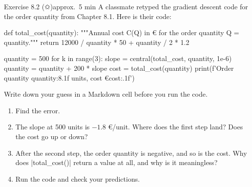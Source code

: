 \documentclass[paper=a4, fontsize=11pt, parskip=half]{scrartcl}
\begin{document}
\clearpage
\begin{aufgabe}{Exercise 8.2 (✩)}{approx.\ 5 min}
A classmate retyped the gradient descent code for the order quantity from Chapter 8.1. Here is their code:

\begin{code}
def total_cost(quantity):
    """Annual cost C(Q) in € for the order quantity Q = quantity."""
    return 12000 / quantity * 50 + quantity / 2 * 1.2

quantity = 500
for k in range(3):
    slope = central(total_cost, quantity, 1e-6)
    quantity = quantity + 200 * slope
    cost = total_cost(quantity)
    print(f'Order quantity {quantity:8.1f} units, cost €{cost:.1f}')
\end{code}

Write down your guess in a Markdown cell before you run the code.

\begin{enumerate}
  \item Find the error.
  \item The slope at 500 units is $-1.8$ €/unit. Where does the first step land? Does the cost go up or down?
  \item After the second step, the order quantity is negative, and so is the cost. Why does \py|total_cost()| return a value at all, and why is it meaningless?
  \item Run the code and check your predictions.
\end{enumerate}

\end{aufgabe}
\end{document}
